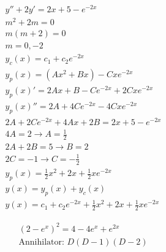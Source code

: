 \documentclass[12pt]{article}
\begin{document}
\hline
\begin{equation}
  \begin{split}
    y''+2y'=2x+5-e^{-2x}\\
    m^2+2m=0\\
    m(m+2)=0\\
    m=0,-2\\
    y_c(x)=c_1+c_2e^{-2x}\\
    y_p(x)=(Ax^2+Bx)-Cxe^{-2x}\\
    y_p(x)'=2Ax+B-Ce^{-2x}+2Cxe^{-2x}\\
    y_p(x)''=2A+4Ce^{-2x}-4Cxe^{-2x}\\
    2A+2Ce^{-2x}+4Ax+2B=2x+5-e^{-2x}\\
    4A=2\rightarrow A=\frac{1}{2}\\
    2A+2B=5\rightarrow B=2\\
    2C=-1\rightarrow C=-\frac{1}{2}\\
    y_p(x)=\frac{1}{2}x^2+2x+\frac{1}{2}xe^{-2x}\\
    y(x)=y_p(x)+y_c(x)\\
    y(x)=c_1+c_2e^{-2x}+\frac{1}{2}x^2+2x+\frac{1}{2}xe^{-2x}
  \end{split}
  \label{4}
\end{equation}

\hline
\begin{equation}
  \begin{split}
    (2-e^x)^2=4-4e^x+e^{2x}\\
    \text{Annihilator: } D(D-1)(D-2)\\
  \end{split}
  \label{5}
\end{equation}
\hline
\end{document}
